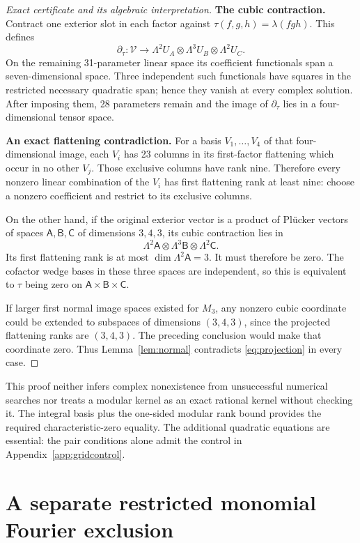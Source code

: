 \documentclass[11pt]{article}
\theoremstyle{definition}\newtheorem{definition}[theorem]{Definition}
\theoremstyle{remark}\newtheorem{remark}[theorem]{Remark}
\begin{document}
\begin{proof}[Exact certificate and its algebraic interpretation]
\textbf{The cubic contraction.}
Contract one exterior slot in each factor against
$\tau(f,g,h)=\lambda(fgh)$. This defines
\[
 \partial_\tau:\mathcal V\longrightarrow
 \Lambda^2U_A\otimes\Lambda^3U_B\otimes\Lambda^2U_C.
\]
On the remaining 31-parameter linear space its coefficient functionals
span a seven-dimensional space. Three independent such functionals have
squares in the restricted necessary quadratic span; hence they vanish at
every complex solution. After imposing them, 28 parameters remain and the
image of $\partial_\tau$ lies in a four-dimensional tensor space.

\textbf{An exact flattening contradiction.}
For a basis $V_1,\ldots,V_4$ of that four-dimensional image, each $V_i$ has
23 columns in its first-factor flattening which occur in no other $V_j$.
Those exclusive columns have rank nine. Therefore every nonzero linear
combination of the $V_i$ has first flattening rank at least nine: choose a
nonzero coefficient and restrict to its exclusive columns.

On the other hand, if the original exterior vector is a product of
Pl\"ucker vectors of spaces $\mathsf A,\mathsf B,\mathsf C$ of dimensions
$3,4,3$, its cubic contraction lies in
\[
 \Lambda^2\mathsf A\otimes\Lambda^3\mathsf B\otimes\Lambda^2\mathsf C.
\]
Its first flattening rank is at most $\dim\Lambda^2\mathsf A=3$.
It must therefore be zero. The cofactor wedge bases in these three spaces
are independent, so this is equivalent to $\tau$ being zero on
$\mathsf A\times\mathsf B\times\mathsf C$.

If larger first normal image spaces existed for $M_3$, any nonzero cubic
coordinate could be extended to subspaces of dimensions $(3,4,3)$, since
the projected flattening ranks are $(3,4,3)$. The preceding conclusion
would make that coordinate zero. Thus Lemma~\ref{lem:normal} contradicts
\eqref{eq:projection} in every case.
\end{proof}

This proof neither infers complex nonexistence from unsuccessful numerical
searches nor treats a modular kernel as an exact rational kernel without
checking it. The integral basis plus the one-sided modular rank bound
provides the required characteristic-zero equality. The additional
quadratic equations are essential: the pair conditions alone admit the
control in Appendix~\ref{app:gridcontrol}.

\section{A separate restricted monomial Fourier exclusion}
\end{document}
